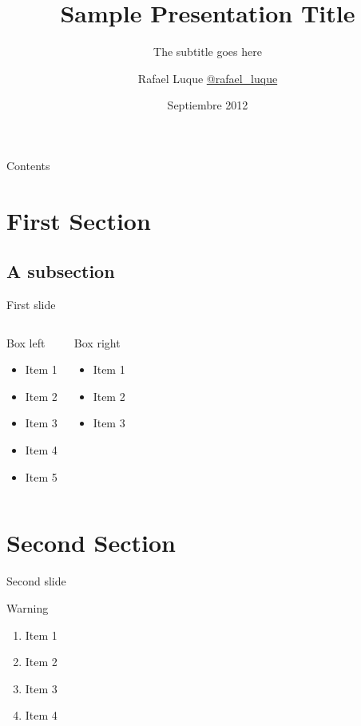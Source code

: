 \documentclass{beamer}
\title{Sample Presentation Title}
\subtitle{The subtitle goes here}
\author{Rafael Luque \href{http://twitter.com/rafael_luque}{@rafael\_luque}}
\institute[OSOCO]{%
  \href{http://osoco.es}{OSOCO}
}
\date[09/2012]{Septiembre 2012}
\begin{document}
\begin{frame}[plain]
  \titlepage
\end{frame}

\begin{frame}[plain]{Contents}
  \tableofcontents[hideallsubsections]
\end{frame}

\section{First Section}

\subsection{A subsection}

\begin{frame}{First slide}
	\begin{columns}[t]
		\begin{block}{Box left}
			\begin{itemize}
				\item Item 1
				\item Item 2
				\item Item 3
				\item Item 4				
				\item Item 5
			\end{itemize}
		\end{block}
		\pause

		\begin{block}{Box right}
			\begin{itemize}
				\item Item 1
				\item Item 2
				\item Item 3
			\end{itemize}
		\end{block}
	\end{columns}
\end{frame}

\section{Second Section}

\begin{frame}{Second slide}
  \begin{alertblock}{Warning}
  \begin{enumerate}
    \item Item 1
    \item Item 2
    \item Item 3
    \item Item 4
  \end{enumerate}
  \end{alertblock}
\end{frame}
\end{document}

